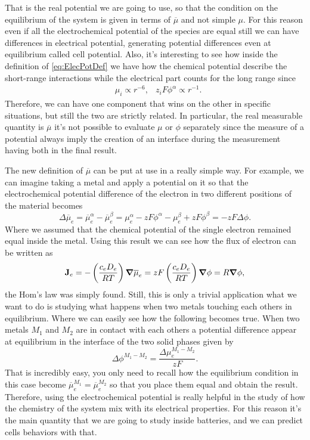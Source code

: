 That is the real potential we are going to use, so that the condition on the equilibrium of the system is given in terms of $\overline{\mu}$ and not simple $\mu$. For this reason even if all the electrochemical potential of the species are equal still we can have differences in electrical potential, generating potential differences even at equilibrium called cell potential. Also, it's interesting to see how inside the definition of \eqref{eq:ElecPotDef} we have how the chemical potential describe the short-range interactions while the electrical part counts for the long range since
\begin{align}
    &\mu_i \propto r^{-6}, &z_iF\phi^\alpha \propto r^{-1}.
\end{align}
Therefore, we can have one component that wins on the other in specific situations, but still the two are strictly related. In particular, the real measurable quantity is $\overline{\mu}$ it's not possible to evaluate $\mu$ or $\phi$ separately since the measure of a potential always imply the creation of an interface during the measurement having both in the final result.

The new definition of $\overline{\mu}$ can be put at use in a really simple way. For example, we can imagine taking a metal and apply a potential on it so that the electrochemical potential difference of the electron in two different positions of the material becomes
\begin{equation}
    \Delta \overline{\mu}_e = \overline{\mu}_e^\alpha - \overline{\mu}_e^\beta = \mu_e^\alpha - zF\phi^\alpha - \mu_e^\beta + zF\phi^\beta = -zF\Delta\phi.
\end{equation}
Where we assumed that the chemical potential of the single electron remained equal inside the metal. Using this result we can see how the flux of electron can be written as
\begin{equation}
    \vb{J}_e = - \left( \frac{c_eD_e}{RT} \right)\grad \overline{\mu}_e = zF\left( \frac{c_eD_e}{RT} \right)\grad \phi = R\grad \phi,
\end{equation}
the Hom's law was simply found. Still, this is only a trivial application what we want to do is studying what happens when two metals touching each others in equilibrium. Where we can easily see how the following becomes true.
{
    When two metals $M_1$ and $M_2$ are in contact with each others a potential difference appear at equilibrium in the interface of the two solid phases given by
    \begin{equation}
        \Delta \phi^{M_1-M_2} = \frac{\Delta \mu^{M_1 - M_2}_e}{zF}.
    \end{equation}
}
{
    That is incredibly easy, you only need to recall how the equilibrium condition in this case become $\overline{\mu}_e^{M_1} = \overline{\mu}_e^{M_2}$ so that you place them equal and obtain the result.
}
\noindent
Therefore, using the electrochemical potential is really helpful in the study of how the chemistry of the system mix with its electrical properties. For this reason it's the main quantity that we are going to study inside batteries, and we can predict cells behaviors with that.

